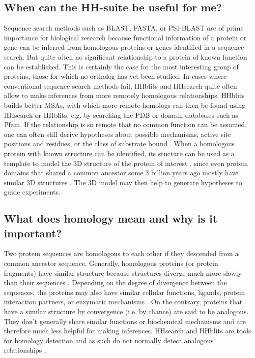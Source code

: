 \documentclass[11pt,a4paper]{article}
\begin{document}
\subsection{When can the HH-suite be useful for me?}
Sequence search methods such as BLAST, FASTA, or PSI-BLAST are of prime importance for biological research because functional information of a protein or gene can be inferred from homologous proteins or genes identified in a sequence search. But quite often no significant relationship to a protein of known function can be established. This is certainly the case for the most interesting group of proteins, those for which no ortholog has yet been studied. In cases where conventional sequence search methods fail, HHblits and HHsearch quite often allow to make inferences from more remotely homologous relationships. HHblits builds better MSAs, with which more remote homologs can then be found using HHsearch or HHblits, e.g. by searching the PDB or domain databases such as Pfam. If the relationship is so remote that no common function can be assumed, one can often still derive hypotheses about possible mechanisms, active site positions and residues, or the class of substrate bound \cite{Todd:2001, Pawlowski:2000}. When a homologous protein with known structure can be identified, its stucture can be used as a template to model the 3D structure of the protein of interest \cite{Rychlewski:1998}, since even protein domains that shared a common ancestor some 3 billion years ago mostly have similar 3D structures \cite{Kinch:2002,Soding:2006a,Alva:2010}. The 3D model may then help to generate hypotheses to guide experiments. 

\subsection{What does homology mean and why is it important?}
Two protein sequences are homologous to each other if they descended from a common ancestor sequence. Generally, homologous proteins (or protein fragments) have similar structure because structures diverge much more slowly than their sequences \cite{Chothia:1986}. Depending on the degree of divergence between the sequences, the proteins may also have similar cellular functions, ligands, protein interaction partners, or enzymatic mechanisms \cite{Todd:2001}. On the contrary, proteins that have a similar structure by convergence (i.e. by chance) are said to be analogous. They don't generally share similar functions or biochemical mechanisms and are therefore much less helpful for making inferences. HHsearch and HHblits are tools for homology detection and as such do not normally detect analogous relationships \cite{Alva:2010,Remmert:2010}.
\end{document}
